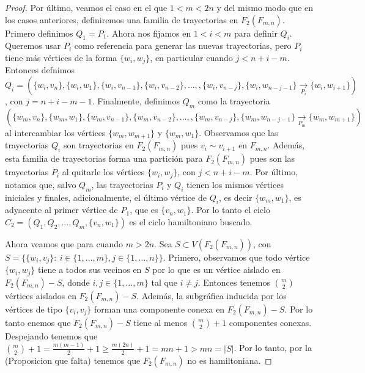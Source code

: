 \begin{proof}
    Por \'ultimo, veamos el caso en el que $1<m<2n$ y del mismo modo que en los
    casos anteriores, definiremos una familia de trayectorias en $F_2(F_{m,n})$.
    Primero definimos $Q_1 =P_1$. Ahora nos fijamos en $1<i<m$ para definir
    $Q_i$. Queremos usar $P_i$ como referencia para generar las nuevas
    trayectorias, pero $P_i$ tiene m\'as v\'ertices de la forma $\{w_i,w_j\}$,
    en particular cuando $j< n+i-m$. Entonces defnimos $Q_i =
    (\{w_i,v_n\},\{w_i,w_1\},\{w_i,v_{n-1}\},\{w_i,v_{n-2}\}, \dots,
    ,\{w_i,v_{n-j}\},\{w_i,w_{n-j-1}\}\xrightarrow[P_i]{}\{w_i,w_{i+1}\})$, con
    $j = n+i-m-1$. Finalmente, definimos $Q_m$ como la trayectoria
    $(\{w_m,v_n\},\{w_m,w_1\},\{w_m,v_{n-1}\},\{w_m,v_{n-2}\}, \dots,
    ,\{w_m,v_{n-j}\},\{w_m,w_{n-j-1}\}\xrightarrow[P_m]{}\{w_m,w_{m+1}\})$ al
    intercambiar los v\'ertices $\{w_m,w_{m+1}\}$ y $\{w_m,w_1\}$. Observamos
    que las trayectorias $Q_i$ son trayectorias en $F_2(F_{m,n})$ pues $v_i \sim
    v_{i+1}$ en $F_{m,n}$. Adem\'as, esta familia de trayectorias forma una
    partici\'on para $F_2(F_{m,n})$ pues son las trayectorias $P_i$ al quitarle
    los v\'ertices $\{w_i,w_j\}$, con $j< n+i-m$. Por \'ultimo, notamos que,
    salvo $Q_m$, las trayectorias $P_i$ y $Q_i$ tienen los mismos v\'ertices
    iniciales y finales, adicionalmente, el \'ultimo v\'ertice de $Q_i$, es
    decir $\{w_m,w_1\}$, es adyacente al primer v\'ertice de $P_1$, que es
    $\{v_n,w_1\}$. Por lo tanto el ciclo $C_2=(Q_1,Q_2, \dots, Q_m,
    \{v_n,w_1\})$ es el ciclo hamiltoniano buscado.

    Ahora veamos que para cuando $m>2n$. Sea $S \subset V(F_2(F_{m,n}))$, con
    $S=\{\{w_i,v_j\} \colon\ i \in \{1,\dots,m\},j\in\{1,\dots,n\}\}$. Primero,
    observamos que todo v\'ertice $\{w_i,w_j\}$ tiene a todos sus vecinos en $S$
    por lo que es un v\'ertice aislado en $F_2(F_{m,n})-S$, donde $i,j \in
    \{1,\dots,m\}$ tal que $i \neq j$. Entonces tenemos $\binom{m}{2}$
    v\'ertices aislados en $F_2(F_{m,n})-S$. Adem\'as, la subgr\'afica inducida
    por los v\'ertices de tipo $\{v_i,v_j\}$ forman una componente conexa en
    $F_2(F_{m,n})-S$. Por lo tanto enemos que $F_2(F_{m,n})-S$ tiene al menos
    $\binom{m}{2} + 1$ componentes conexas. Despejando tenemos que $\binom{m}{2}
    + 1 = \frac{m(m-1)}{2} + 1 \geq \frac{m(2n)}{2} + 1 = mn + 1 > mn = |S|$.
    Por lo tanto, por la (Proposicion que falta) tenemos que $F_2(F_{m,n})$ no
    es hamiltoniana.

\end{proof}